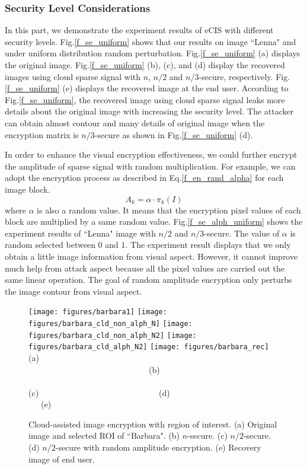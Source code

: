 \documentclass[conference]{IEEEtran}
\begin{document}
\subsubsection{Security Level Considerations}
In this part, we demonstrate  the experiment results of eCIS with different security levels. Fig.\ref{f_se_uniform} shows that
our results on  image ``Lenna" and under uniform distribution random perturbation. Fig.\ref{f_se_uniform} (a) displays the original image. Fig.\ref{f_se_uniform} (b), (c), and (d) display the recovered images using cloud sparse signal with $n$, $n/2$ and $n/3$-secure, respectively. Fig.\ref{f_se_uniform} (e) displays the recovered image at the end user. According to Fig.\ref{f_se_uniform}, the recovered  image  using cloud sparse signal leaks more details about the original image with increasing the security level. The attacker can  obtain almost contour and many details of original image when the encryption matrix is $n/3$-secure as shown in  Fig.\ref{f_se_uniform} (d).

In order to enhance the visual encryption effectiveness, we could further encrypt the amplitude of sparse signal with random multiplication. For example, we can adopt the encryption process as described in  Eq.\ref{f_en_rand_alpha} for each image block.
\begin{equation}\label{f_en_rand_alpha}
     A_k=\alpha\cdot\pi_k(I)
\end{equation}
where $\alpha$ is also a random value. It means that the encryption pixel values of each block are multiplied by a same random value. Fig.\ref{f_se_alph_uniform} shows the experiment results of ``Lenna" image with $n/2$ and $n/3$-secure. The value of $\alpha$ is random selected between $0$ and $1$. The experiment result displays that we only obtain a little image information from  visual aspect. However, it cannot improve much help from attack aspect because all the pixel values are carried out the same linear operation. The goal of random amplitude encryption only perturbs the image contour from visual aspect.
\begin{figure*}[t]
\begin{center}
  \texttt{[image: figures/barbara1]}
  \texttt{[image: figures/barbara\_cld\_non\_alph\_N]}
  \texttt{[image: figures/barbara\_cld\_non\_alph\_N2]}
  \texttt{[image: figures/barbara\_cld\_alph\_N2]}
  \texttt{[image: figures/barbara\_rec]}  \\
  {\footnotesize (a) ~~~~~~~~~~~~~~~~~~~~~~~~~~~~~(b)~~~~~~~~~~~~~~~~~~~~~~~~~~~~~ (c)~~~~~~~~~~~~~~~~~~~~~~~~~~~~~(d)~~~~~~~~~~~~~~~~~~~~~~~~~~~~~(e) }\\
  \caption{{\footnotesize Cloud-assisted image encryption with region of interest. (a) Original image and selected ROI of ``Barbara". (b) $n$-secure. (c) $n/2$-secure. (d) $n/2$-secure with random amplitude encryption. (e) Recovery image of end user.}}\label{f_se_ROI}
   \end{center}
\end{figure*}
\end{document}
